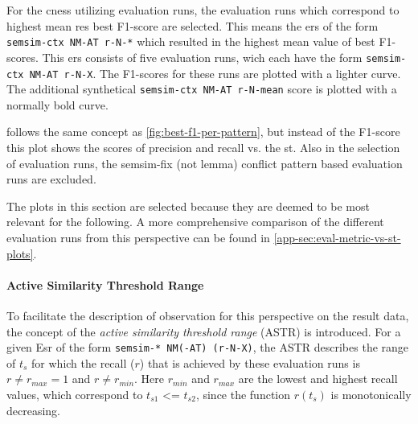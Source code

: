 \documentclass[11pt, numbers=noenddot]{scrreprt}
\begin{document}
For the \gls{cness} utilizing evaluation runs, the evaluation runs which correspond to highest mean \gls{res} best F1-score are selected. This means the \gls{ers} of the form \texttt{semsim-ctx NM-AT r-N-*} which resulted in the highest mean value of best F1-scores. This \gls{ers} consists of five evaluation runs, wich each have the form \texttt{semsim-ctx NM-AT r-N-X}. The F1-scores for these runs are plotted with a lighter curve. The additional synthetical \texttt{semsim-ctx NM-AT r-N-mean} score is plotted with a normally bold curve. 


 follows the same concept as \cref{fig:best-f1-per-pattern}, but instead of the F1-score this plot shows the scores of precision and recall vs. the \gls{st}. Also in the selection of evaluation runs, the semsim-fix (not lemma) conflict pattern based evaluation runs are excluded.

The plots in this section are selected because they are deemed to be most relevant for the following. A more comprehensive comparison of the different evaluation runs from this perspective can be found in \cref{app-sec:eval-metric-vs-st-plots}.


\paragraph{Active Similarity Threshold Range}
To facilitate the description of observation for this perspective on the result data, the concept of the \textit{active similarity threshold range} (ASTR) is introduced. For a given E\gls{sr} of the form \texttt{semsim-* NM(-AT) (r-N-X)}, the ASTR describes the range of \(t_s\) for which the recall (\(r\)) that is achieved by these evaluation runs is \(r \neq r_{max} = 1 \) and \(r \neq r_{min}\). Here \(r_{min}\) and \(r_{max}\) are the lowest and highest recall values, which correspond to \(t_{s1}\) <= \(t_{s2}\), since the function \(r(t_s)\) is monotonically decreasing.
\end{document}
